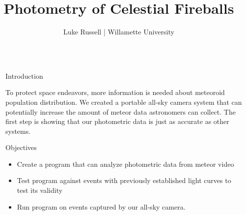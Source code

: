 \documentclass[final]{beamer}
\title{Photometry of Celestial Fireballs} %
\author{Luke Russell | Willamette University} %
\newlength{\sepwid}
\newlength{\onecolwid}
\begin{document}

\setlength{\belowcaptionskip}{0ex} %
\setlength\belowdisplayshortskip{2ex} %

\begin{frame}[t] %

\begin{columns}[t] %

\begin{column}{\sepwid}\end{column} %

\begin{column}{\onecolwid} %



\begin{block}{Introduction}

To protect space endeavors, more information is needed about meteoroid population distribution. We created a portable all-sky camera system that can potentially increase the amount of meteor data astronomers can collect. The first step is showing that our photometric data is just as accurate as other systems.

\end{block}

\begin{alertblock}{Objectives}

 \begin{itemize}
\item Create a program that can analyze photometric data from meteor video
\item Test program against events with previously established light curves to test its validity
\item Run program on events captured by our all-sky camera. 
\end{itemize}


\end{alertblock}
\end{column}
\end{columns}
\end{frame}
\end{document}
